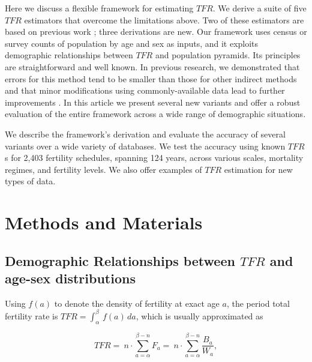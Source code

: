 \documentclass[12pt]{article}
\begin{document}
Here we discuss a flexible framework for estimating \(TFR\). We derive a
suite of five \(TFR\) estimators that overcome the limitations above.
Two of these estimators are based on previous work
\citep{hauer13, schmertmann2019bayesian}; three derivations are new. Our
framework uses census or survey counts of population by age and sex as
inputs, and it exploits demographic relationships between \(TFR\) and
population pyramids. Its principles are straightforward and well known.
In previous research, we demonstrated that errors for this method tend
to be smaller than those for other indirect methods \citep{hauer13} and
that minor modifications using commonly-available data lead to further
improvements \citep{schmertmann2019bayesian}. In this article we present
several new variants and offer a robust evaluation of the entire
framework across a wide range of demographic situations.

We describe the framework's derivation and evaluate the accuracy of
several variants over a wide variety of databases. We test the accuracy
using known \(TFR\)s for 2,403 fertility schedules, spanning 124 years,
across various scales, mortality regimes, and fertility levels. We also
offer examples of \(TFR\) estimation for new types of data.

\hypertarget{methods-and-materials}{%
\section{Methods and Materials}\label{methods-and-materials}}

\hypertarget{demographic-relationships-between-tfr-and-age-sex-distributions}{%
\subsection{\texorpdfstring{Demographic Relationships between \(TFR\)
and age-sex
distributions}{Demographic Relationships between TFR and age-sex distributions}}\label{demographic-relationships-between-tfr-and-age-sex-distributions}}

Using \(f(a)\) to denote the density of fertility at exact age \(a\),
the period total fertility rate is
\(TFR= \int_{\alpha}^{\beta}\,f(a)\,da\), which is usually approximated
as

\begin{equation}
TFR = \: n\cdot \sum_{a=\alpha}^{\beta-n}F_a =\: n\cdot \sum_{a=\alpha}^{\beta-n}\frac{B_a}{W_a},
\end{equation}
\end{document}
